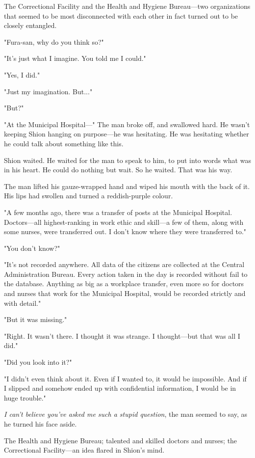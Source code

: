 The Correctional Facility and the Health and Hygiene Bureau---two
organizations that seemed to be most disconnected with each other in
fact turned out to be closely entangled.

"Fura-san, why do you think so?"

"It's just what I imagine. You told me I could."

"Yes, I did."

"Just my imagination. But..."

"But?"

"At the Municipal Hospital---" The man broke off, and swallowed hard. He
wasn't keeping Shion hanging on purpose---he was hesitating. He was
hesitating whether he could talk about something like this.

Shion waited. He waited for the man to speak to him, to put into words
what was in his heart. He could do nothing but wait. So he waited. That
was his way.

The man lifted his gauze-wrapped hand and wiped his mouth with the back
of it. His lips had swollen and turned a reddish-purple colour.

"A few months ago, there was a transfer of posts at the Municipal
Hospital. Doctors---all highest-ranking in work ethic and skill---a few of
them, along with some nurses, were transferred out. I don't know where
they were transferred to."

"You don't know?"

"It's not recorded anywhere. All data of the citizens are collected at
the Central Administration Bureau. Every action taken in the day is
recorded without fail to the database. Anything as big as a workplace
transfer, even more so for doctors and nurses that work for the
Municipal Hospital, would be recorded strictly and with detail."

"But it was missing."

"Right. It wasn't there. I thought it was strange. I thought---but that
was all I did."

"Did you look into it?"

"I didn't even think about it. Even if I wanted to, it would be
impossible. And if I slipped and somehow ended up with confidential
information, I would be in huge trouble."

\emph{I can't believe you've asked me such a stupid question}, the man seemed
to say, as he turned his face aside.

The Health and Hygiene Bureau; talented and skilled doctors and nurses;
the Correctional Facility---an idea flared in Shion's mind.


